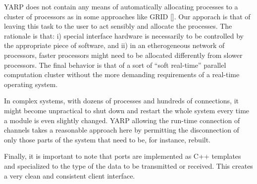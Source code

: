YARP does not contain any means of automatically allocating processes to a cluster of
processors as in some approaches like GRID []. Our apporach is that of leaving this
task to the user to act sensibly and allocate the processes. The rationale is that: i)
special interface hardware is necessarily to be controlled by the appropriate piece of 
software, and ii) in an etherogeneous network of processors, faster processors might 
need to be allocated differently from slower processors. The final behavior is that of 
a sort of ``soft real-time'' parallel computation cluster without the more demanding
requirements of a real-time operating system.

In complex systems, with dozens of processes and hundreds of connections, it might become
unpractical to shut down and restart the whole system every time a module is even slightly 
changed. YARP allowing the run-time connection of channels takes a reasonable approach
here by permitting the disconnection of only those parts of the system that need to be, 
for instance, rebuilt.

Finally, it is important to note that ports are implemented as C++ templates and 
specialized to the type of the data to be transmitted or received. This creates a very 
clean and consistent client interface.



